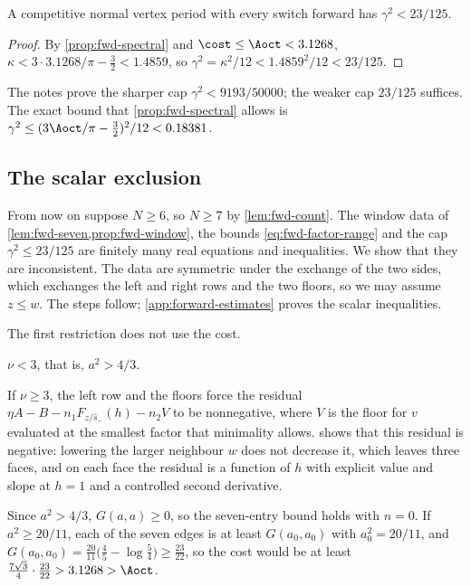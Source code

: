 \begin{corollary}\label{cor:fwd-cap}
A competitive normal vertex period with every switch forward has $\gamma^2<23/125$.
\end{corollary}

\begin{proof}
By \cref{prop:fwd-spectral} and $\cost\le\Aoct<3.1268$, $\kappa<3\cdot3.1268/\pi-\frac32<1.4859$,
so $\gamma^2=\kappa^2/12<1.4859^2/12<23/125$.
\end{proof}

The notes prove the sharper cap $\gamma^2<9193/50000$; the weaker cap $23/125$ suffices. The exact
bound that \cref{prop:fwd-spectral} allows is $\gamma^2\le(3\Aoct/\pi-\frac32)^2/12<0.18381$.

\subsection{The scalar exclusion}

From now on suppose $N\ge6$, so $N\ge7$ by \cref{lem:fwd-count}. The window data of
\cref{lem:fwd-seven,prop:fwd-window}, the bounds \eqref{eq:fwd-factor-range} and the cap
$\gamma^2\le23/125$ are finitely many real equations and inequalities. We show that they are
inconsistent. The data are symmetric under the
exchange of the two sides, which exchanges the left and right rows and the two floors, so we may
assume $z\le w$. The steps follow; \cref{app:forward-estimates} proves the scalar inequalities.

 The first restriction does not use the cost.

\begin{lemma}\label{lem:fwd-small}
$\nu<3$, that is, $a^2>4/3$.
\end{lemma}

If $\nu\ge3$, the left row and the floors force the residual
$\eta A-B-n_1F_{z/\hat s_-}(h)-n_2V$ to be nonnegative, where $V$ is the floor for $v$ evaluated at
the smallest factor that minimality allows.  shows that this residual is
negative: lowering the larger neighbour $w$ does not decrease it, which leaves three faces, and on
each face the residual is a function of $h$ with explicit value and slope at $h=1$ and a controlled
second derivative.

 Since $a^2>4/3$, $G(a,a)\ge0$, so the
seven-entry bound holds with $n=0$. If $a^2\ge20/11$, each of the seven edges is at least
$G(a_0,a_0)$ with $a_0^2=20/11$, and $G(a_0,a_0)=\frac{20}{11}\bigl(\frac45-\log\frac54\bigr)\ge
\frac{23}{22}$, so the cost would be at least $\frac{7\sqrt3}{4}\cdot\frac{23}{22}>3.1268>\Aoct$.

